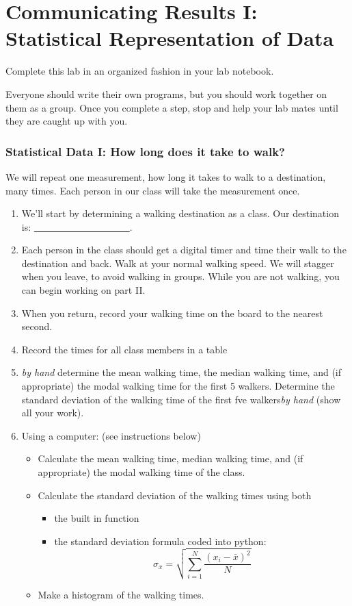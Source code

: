 \documentclass[twoside,11pt,ShortChapTitles]{BYUTextbook}
\begin{document}
\chapter[Statistical Representation of Data]{Communicating Results I: Statistical Representation of Data}

Complete this lab in an organized fashion in your lab notebook.

Everyone should write their own programs, but you should work together on them as a group.  Once you complete a step, stop and help your lab mates until they are caught up with you.

\subsection{Statistical Data I: How long does it take to walk?}

We will repeat one measurement, how long it takes to walk to a destination,
many times. Each person in our class will take the measurement once.

\begin{enumerate}
\item We'll start by determining a walking destination as a class. Our
destination is: \underline{\ \ \ \ \ \ \ \ \ \ \ \ \ \ \ \ \ \ \ \ }.

\item Each person in the class should get a digital timer and time their
walk to the destination and back. Walk at your normal walking speed. We will
stagger when you leave, to avoid walking in groups. While you are not
walking, you can begin working on part II.

\item When you return, record your walking time on the board to the nearest
second.

\item Record the times for all class members in a table
\item  \emph{by hand}
determine the mean walking time, the median walking time, and (if
appropriate) the modal walking time for the first 5 walkers. Determine the standard deviation of the
walking time of the first fve walkers\emph{by hand} (show all your work).

\item Using a computer: (see instructions below)
\begin{itemize}
\item Calculate the mean walking time, median walking time, and (if appropriate) the modal walking time of the class.
\item Calculate the standard deviation of the walking times using both
\begin{itemize}
\item the built in  function
\item the standard deviation formula coded into python: \[
\sigma _{x}=\sqrt{\sum_{i=1}^{N}\frac{\left( x_{i}-\bar{x}\right) ^{2}}{N}}
\]
\end{itemize}
\item Make a histogram of the walking times.
\end{itemize}
\end{enumerate}
\end{document}

